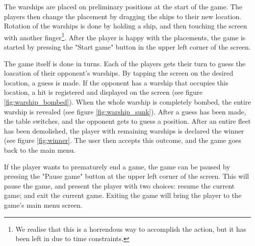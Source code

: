 The warships are placed on preliminary positions at the start of the game. The players then change the placement by dragging the ships to their new location. Rotation of the warships is done by holding a ship, and then touching the screen with another finger\footnote{We realise that this is a horrendous way to accomplish the action, but it has been left in due to time constraints.}. After the player is happy with the placements, the game is started by pressing the "Start game" button in the upper left corner of the screen.

The game itself is done in turns. Each of the players gets their turn to guess the loacation of their opponent's warships. By tapping the screen on the desired location, a guess is made. If the opponent has a warship that occupies this location, a hit is registered and displayed on the screen (see figure \ref{fig:warship_bombed}). When the whole warship is completely bombed, the entire warship is revealed (see figure \ref{fig:warship_sunk}). After a guess has been made, the table switches, and the opponent gets to guess a position. After an entire fleet has been demolished, the player with remaining warships is declared the winner (see figure \ref{fig:winner}. The user then accepts this outcome, and the game goes back to the main menu.

If the player wants to prematurely end a game, the game can be paused by pressing the "Pause game" button at the upper left corner of the screen. This will pause the game, and present the player with two choices: resume the current game; and exit the current game. Exiting the game will bring the player to the game's main menu screen.